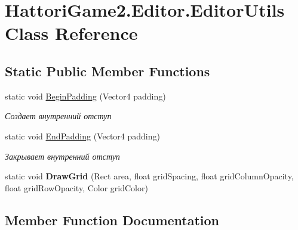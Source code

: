 \hypertarget{class_hattori_game2_1_1_editor_1_1_editor_utils}{}\section{Hattori\+Game2.\+Editor.\+Editor\+Utils Class Reference}
\label{class_hattori_game2_1_1_editor_1_1_editor_utils}
\subsection*{Static Public Member Functions}
\begin{DoxyCompactItemize}
\item 
static void \hyperlink{class_hattori_game2_1_1_editor_1_1_editor_utils_a25448d5a52966e0bec358cd8a221fe68_a25448d5a52966e0bec358cd8a221fe68}{Begin\+Padding} (Vector4 padding)
\begin{DoxyCompactList}\small\item\em Создает внутренний отступ \end{DoxyCompactList}\item 
static void \hyperlink{class_hattori_game2_1_1_editor_1_1_editor_utils_a2ac7a3491abc2898cf84de9e6910ab2b_a2ac7a3491abc2898cf84de9e6910ab2b}{End\+Padding} (Vector4 padding)
\begin{DoxyCompactList}\small\item\em Закрывает внутренний отступ \end{DoxyCompactList}\item 
\hypertarget{class_hattori_game2_1_1_editor_1_1_editor_utils_adbcb20f16369765559cdece1c850abc4}{}static void {\bfseries Draw\+Grid} (Rect area, float grid\+Spacing, float grid\+Column\+Opacity, float grid\+Row\+Opacity, Color grid\+Color)\label{class_hattori_game2_1_1_editor_1_1_editor_utils_adbcb20f16369765559cdece1c850abc4}

\end{DoxyCompactItemize}


\subsection{Member Function Documentation}
\hypertarget{class_hattori_game2_1_1_editor_1_1_editor_utils_a25448d5a52966e0bec358cd8a221fe68_a25448d5a52966e0bec358cd8a221fe68}{}
